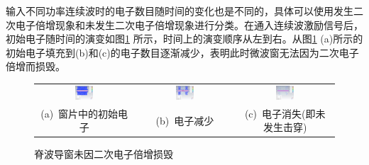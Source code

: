 \documentclass[master]{thesis-uestc}
\begin{document}
输入不同功率连续波时的电子数目随时间的变化也是不同的，具体可以使用发生二次电子倍增现象和未发生二次电子倍增现象进行分类。在通入连续波激励信号后，初始电子随时间的演变如图\ref{fig:L未发生二次电子倍增} 所示，时间上的演变顺序从左到右。从图\ref{fig:L未发生二次电子倍增} (a)所示的初始电子填充到(b)和(c)的电子数目逐渐减少，表明此时微波窗无法因为二次电子倍增而损毁。
\begin{figure}[!htb]
    \small
    \centering
    \begin{tabular}{@{\ }c@{\ }c@{\ }c}
        \includegraphics[width=0.2\textwidth]{pic/chapter4/L电子初始分布顶视图.png} & 
        \hspace{5pt}
        \includegraphics[width=0.2\textwidth]{pic/chapter4/L电子分布-消逝-顶视图.png}&
        \hspace{5pt}
        \includegraphics[width=0.2\textwidth]{pic/chapter4/L电子分布-完全消亡-顶视图.png}      \\
        \mbox{\small (a) 窗片中的初始电子}                                                                               & 
        \mbox{\small (b) 电子减少} & 
        \mbox{\small (c) 电子消失(即未发生击穿)}                                                                                  \\
    \end{tabular}
    \caption{脊波导窗未因二次电子倍增损毁}
    \label{fig:L未发生二次电子倍增}
\end{figure}
\end{document}
